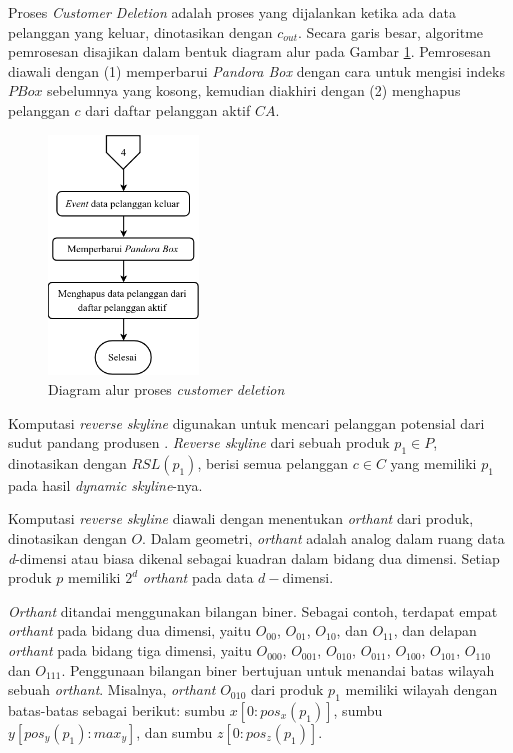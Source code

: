\pagebreak
{}

Proses \textit{Customer Deletion} adalah proses yang dijalankan ketika ada data pelanggan yang keluar, dinotasikan dengan $c_{out}$. Secara garis besar, algoritme pemrosesan disajikan dalam bentuk diagram alur pada Gambar \ref{fig:flowchart-co}. Pemrosesan diawali dengan (1) memperbarui \textit{Pandora Box} dengan cara untuk mengisi indeks $PBox$ sebelumnya yang kosong, kemudian diakhiri dengan (2) menghapus pelanggan $c$ dari daftar pelanggan aktif $CA$.  

\begin{figure}[H]
	\centering
	\includegraphics[width=4cm]{assets/img/bab3/flowchart-co.png}
	\caption{Diagram alur proses \textit{customer deletion}}
	\label{fig:flowchart-co}
\end{figure}



Komputasi \textit{reverse skyline} digunakan untuk mencari pelanggan potensial dari sudut pandang produsen \cite{kmpp}. \textit{Reverse skyline} \cite{reverse-skyline} dari sebuah produk $p_1 \in
P$, dinotasikan dengan $RSL(p_1)$, berisi semua pelanggan $c \in C$ yang memiliki $p_1$ pada hasil \textit{dynamic skyline}-nya.

\pagebreak
Komputasi \textit{reverse skyline} diawali dengan menentukan \textit{orthant} dari produk, dinotasikan dengan $O$. Dalam geometri, \textit{orthant} adalah analog dalam ruang data \textit{d}-dimensi atau biasa dikenal sebagai kuadran dalam bidang dua dimensi. Setiap produk $p$ memiliki $2^d$ \textit{orthant} pada data $d-$dimensi. 

\textit{Orthant} ditandai menggunakan bilangan biner. Sebagai contoh, terdapat empat \textit{orthant} pada bidang dua dimensi, yaitu $O_{00}$, $O_{01}$, $O_{10}$, dan $O_{11}$, dan delapan \textit{orthant} pada bidang tiga dimensi, yaitu $O_{000}$, $O_{001}$, $O_{010}$, $O_{011}$, $O_{100}$, $O_{101}$, $O_{110}$ dan $O_{111}$. Penggunaan bilangan biner bertujuan untuk menandai batas wilayah sebuah \textit{orthant}. Misalnya, \textit{orthant} $O_{010}$ dari produk $p_1$ memiliki wilayah dengan batas-batas sebagai berikut: sumbu $x [0:pos_x(p_1)]$, sumbu $y [pos_y(p_1):max_y]$, dan sumbu $z [0:pos_z(p_1)]$.

